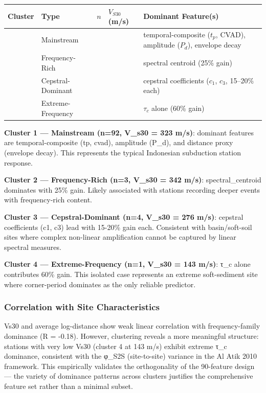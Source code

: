 \documentclass[10pt]{article}
\begin{document}
\begin{longtable}[]{@{}>{\centering\arraybackslash}p{1.5cm}>{\raggedright\arraybackslash}p{2.8cm}>{\centering\arraybackslash}p{1.2cm}>{\centering\arraybackslash}p{1.5cm}>{\raggedright\arraybackslash}p{4.5cm}@{}}
\toprule
Cluster & Type & $n$ & $V_{S30}$ (m/s) & Dominant Feature(s) \\
\midrule
\endhead
\bottomrule
\endlastfoot
1 & Mainstream & 92 & 323 & temporal-composite ($t_p$, CVAD), amplitude ($P_d$), envelope decay \\
2 & Frequency-Rich & 3 & 342 & spectral centroid (25\% gain) \\
3 & Cepstral-Dominant & 4 & 276 & cepstral coefficients ($c_1$, $c_3$, 15--20\% each) \\
4 & Extreme-Frequency & 1 & 143 & $\tau_c$ alone (60\% gain) \\
\end{longtable}

\textbf{Cluster 1 --- Mainstream (n=92, V\_s30 = 323 m/s)}: dominant features are temporal-composite (tp, cvad), amplitude (P\_d), and distance proxy (envelope decay). This represents the typical Indonesian subduction station response.

\textbf{Cluster 2 --- Frequency-Rich (n=3, V\_s30 = 342 m/s)}: spectral\_centroid dominates with 25\% gain. Likely associated with stations recording deeper events with frequency-rich content.

\textbf{Cluster 3 --- Cepstral-Dominant (n=4, V\_s30 = 276 m/s)}: cepstral coefficients (c1, c3) lead with 15-20\% gain each. Consistent with basin/soft-soil sites where complex non-linear amplification cannot be captured by linear spectral measures.

\textbf{Cluster 4 --- Extreme-Frequency (n=1, V\_s30 = 143 m/s)}: τ\_c alone contributes 60\% gain. This isolated case represents an extreme soft-sediment site where corner-period dominates as the only reliable predictor.

\subsubsection{Correlation with Site Characteristics}

Vs30 and average log-distance show weak linear correlation with frequency-family dominance (R = -0.18). However, clustering reveals a more meaningful structure: stations with very low Vs30 (cluster 4 at 143 m/s) exhibit extreme τ\_c dominance, consistent with the φ\_S2S (site-to-site) variance in the Al Atik 2010 framework. This empirically validates the orthogonality of the 90-feature design --- the variety of dominance patterns across clusters justifies the comprehensive feature set rather than a minimal subset.
\end{document}
